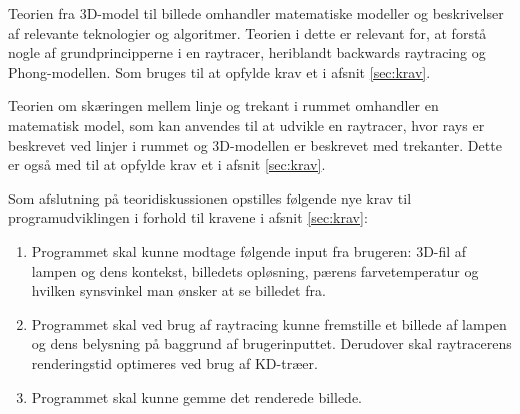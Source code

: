 Teorien fra 3D-model til billede omhandler matematiske modeller og beskrivelser af relevante teknologier og algoritmer. Teorien i dette er relevant for, at forstå nogle af grundprincipperne i en raytracer, heriblandt backwards raytracing og Phong-modellen. Som bruges til at opfylde krav et i afsnit \ref{sec:krav}.

Teorien om skæringen mellem linje og trekant i rummet omhandler en matematisk model, som kan anvendes til at udvikle en raytracer, hvor rays er beskrevet ved linjer i rummet og 3D-modellen er beskrevet med trekanter. Dette er også med til at opfylde krav et i afsnit \ref{sec:krav}.

Som afslutning på teoridiskussionen opstilles følgende nye krav til programudviklingen i forhold til kravene i afsnit \ref{sec:krav}:
\begin{enumerate}
    \item Programmet skal kunne modtage følgende input fra brugeren: 3D-fil af lampen og dens kontekst, billedets opløsning, pærens farvetemperatur og hvilken synsvinkel man ønsker at se billedet fra.
    \item Programmet skal ved brug af raytracing kunne fremstille et billede af lampen og dens belysning på baggrund af brugerinputtet. Derudover skal raytracerens renderingstid optimeres ved brug af KD-træer.
    \item Programmet skal kunne gemme det renderede billede.
\end{enumerate}
